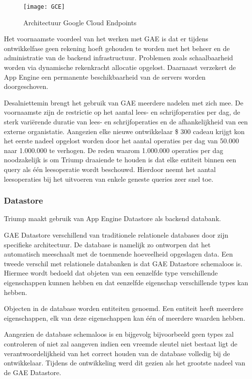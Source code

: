 \begin{figure}[H]
	\centering
	\texttt{[image: GCE]}
	\caption{Architectuur Google Cloud Endpoints}
	\label{fig:Architectuur Google Cloud Endpoints}
\end{figure}

Het voornaamste voordeel van het werken met GAE is dat er tijdens ontwikkelfase geen rekening hoeft gehouden te worden met het  beheer en de administratie van de backend infrastructuur. Problemen zoals schaalbaarheid worden via dynamische rekenkracht allocatie opgelost. Daarnaast verzekert de App Engine een permanente beschikbaarheid van de servers worden doorgeschoven.

Desalniettemin brengt het gebruik van GAE meerdere nadelen met zich mee. De voornaamste zijn de restrictie op het aantal lees- en schrijfoperaties per dag, de sterk variërende duratie van lees- en schrijfoperaties en de afhankelijkheid van een externe organistatie. Aangezien elke nieuwe ontwikkelaar \$ 300 cadeau krijgt kon het eerste nadeel opgelost worden door het aantal operaties per dag van 50.000 naar 1.000.000 te verhogen. De reden waarom 1.000.000 operaties per dag noodzakelijk is om Triump draaiende te houden is dat elke entiteit binnen een query als één leesoperatie wordt beschouwd. Hierdoor neemt het aantal leesoperaties bij het uitvoeren van enkele geneste queries zeer snel toe.

\subsubsection{Datastore}

Triump maakt gebruik van App Engine Datastore als backend databank.

GAE Datastore verschillend van traditionele relationele databases door zijn specifieke architectuur. De database is namelijk zo ontworpen dat het automatisch meeschaalt met de toenmende hoeveelheid opgeslagen data. Een tweede verschil met relationele databanken is dat GAE Datastore schemaloos is. Hiermee wordt bedoeld dat objeten van een eenzelfde type verschillende eigenschappen kunnen hebben en dat eenzelfde eigenschap verschillende types kan hebben. 

Objecten in de database worden entiteiten genoemd. Een entiteit heeft meerdere eigenschappen, elk van deze eigenschappen kan één of meerdere waarden hebben. 

Aangezien de database schemaloos is en bijgevolg bijvoorbeeld geen types zal controleren of niet zal aangeven indien een vreemde sleutel niet bestaat ligt de verantwoordelijkheid van het correct houden van de database volledig bij de ontwikkelaar. Tijdens de ontwikkeling werd dit gezien als het grootste nadeel van de GAE Datastore.

